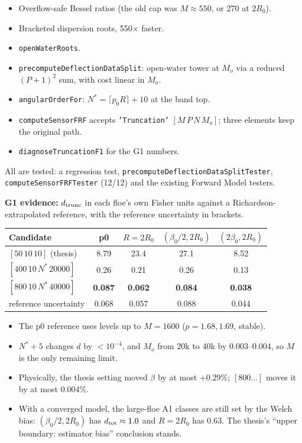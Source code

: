 \documentclass[10pt,a4paper]{article}
\begin{document}
\begin{itemize}
\item Overflow-safe Bessel ratios (the old cap was $M\approx550$, or 270 at $2R_0$).
\item Bracketed dispersion roots, 550$\times$ faster.
\item \texttt{openWaterRoots}.
\item \texttt{precomputeDeflectionDataSplit}: open-water tower at $M_o$ via a reduced $(P{+}1)^2$ sum, with cost linear in $M_o$.
\item \texttt{angularOrderFor}: $N^*=\lceil p_0R\rceil+10$ at the band top.
\item \texttt{computeSensorFRF} accepts \texttt{'Truncation'} $[M\,P\,N\,M_o]$; three elements keep the original path.
\item \texttt{diagnoseTruncationF1} for the G1 numbers.
\end{itemize}
All are tested: a regression test, \texttt{precomputeDeflectionDataSplitTester}, \texttt{computeSensorFRFTester} (12/12) and the existing Forward Model testers.

\textbf{G1 evidence:} $d_{\rm trunc}$ in each floe's own Fisher units against a Richardson-extrapolated reference, with the reference uncertainty in brackets.

\begin{center}\small
\begin{tabular}{@{}lcccc@{}}
\toprule
Candidate & p0 & $R=2R_0$ & $(\beta_0/2, 2R_0)$ & $(2\beta_0, 2R_0)$ \\
\midrule
$[50\,10\,10]$ (thesis) & 8.79 & 23.4 & 27.1 & 8.52 \\
$[400\,10\,N^*\,20000]$ & 0.26 & 0.21 & 0.26 & 0.13 \\
$[800\,10\,N^*\,40000]$ & \textbf{0.087} & \textbf{0.062} & \textbf{0.084} & \textbf{0.038} \\
reference uncertainty & 0.068 & 0.057 & 0.088 & 0.044 \\
\bottomrule
\end{tabular}
\end{center}
\begin{itemize}
\item The p0 reference uses levels up to $M=1600$ ($p=1.68, 1.69$, stable).
\item $N^*+5$ changes $d$ by $<10^{-4}$, and $M_o$ from 20k to 40k by $0.003$--$0.004$, so $M$ is the only remaining limit.
\item Physically, the thesis setting moved $\beta$ by at most $+0.29\%$; $[800\ldots]$ moves it by at most $0.004\%$.
\item With a converged model, the large-floe A1 classes are still set by the Welch bias: $(\beta_0/2,2R_0)$ has $d_{\rm tot}\approx1.0$ and $R=2R_0$ has $0.63$. The thesis's ``upper boundary: estimator bias'' conclusion stands.
\end{itemize}
\end{document}
